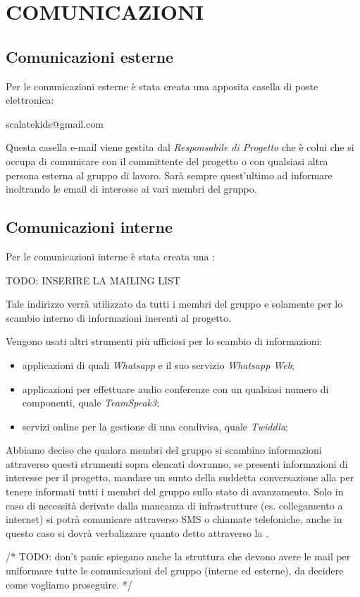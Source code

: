 \section{COMUNICAZIONI}
\subsection{Comunicazioni esterne}
Per le comunicazioni esterne è stata creata una apposita casella di poste elettronica: 
\begin{center}
scalatekids@gmail.com 	
\end{center}
Questa casella e-mail viene gestita dal \textit{Responsabile di Progetto} che è colui che si occupa di comunicare con il committente del progetto o con qualsiasi altra persona esterna al gruppo di lavoro. Sarà sempre quest'ultimo ad informare inoltrando le email di interesse ai vari membri del gruppo.

\subsection{Comunicazioni interne}
Per le comunicazioni interne è stata creata una :
\begin{center}
TODO: INSERIRE LA MAILING LIST 
\end{center}
Tale indirizzo verrà utilizzato da tutti i membri del gruppo e solamente per lo scambio interno di informazioni inerenti al progetto.

Vengono usati altri strumenti più ufficiosi per lo scambio di informazioni:
\begin{itemize}
\item applicazioni di  quali \textit{Whatsapp} e il suo servizio \textit{Whatsapp Web};
\item applicazioni  per effettuare audio conferenze con un qualsiasi numero di componenti, quale \textit{TeamSpeak3};
\item servizi online per la gestione di una  condivisa, quale \textit{Twiddla};
\end{itemize}

Abbiamo deciso che qualora membri del gruppo si scambino informazioni attraverso questi strumenti sopra elencati dovranno, se presenti informazioni di interesse per il progetto, mandare un sunto della suddetta conversazione alla  per tenere informati tutti i membri del gruppo sullo stato di avanzamento.
Solo in caso di necessità derivate dalla mancanza di infrastrutture (es. collegamento a internet) si potrà comunicare attraverso SMS o chiamate telefoniche, anche in questo caso si dovrà verbalizzare quanto detto attraverso la .

/*
	TODO: don't panic spiegano anche la struttura che devono avere le mail per uniformare tutte le comunicazioni del gruppo (interne ed esterne), da decidere come vogliamo proseguire.
*/
